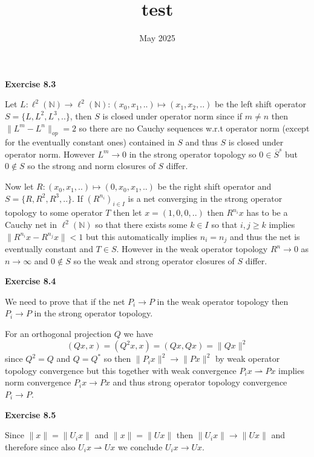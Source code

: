 \documentclass{article}
\title{test}
\date{May 2025}
\begin{document}
\vspace{0.5cm}

\textbf{Exercise 8.3}

\vspace{0.5cm}

Let $L: \ell^2(\mathbb N) \rightarrow \ell^2(\mathbb N):(x_0,x_1,..) \mapsto (x_1,x_2,..)$ be the left shift operator $S = \{L,L^2,L^3,..\}$, then $S$ is closed under operator norm since if $m \neq n$ then $\| L^m -L^n\|_{op} = 2$ so there are no Cauchy sequences w.r.t operator norm (except for the eventually constant ones) contained in $S$ and thus $S$ is closed under operator norm. However $L^m \rightarrow 0$ in the strong operator topology so $0 \in \overline S^{s}$ but $0 \not \in S$ so the strong and norm closures of $S$ differ. 

Now let $R: (x_0,x_1,..) \mapsto (0,x_0,x_1,..)$ be the right shift operator and $S = \{R,R^2,R^3,..\}$. If $(R^{n_i})_{i \in I}$ is a net converging in the strong operator topology to some operator $T$ then let $x = (1,0,0,..)$ then $R^{n_i}x$ has to be a Cauchy net in $\ell^2(\mathbb N)$ so that there exists some $k \in I$ so that $i,j \geq k$ implies $\|R^{n_i}x - R^{n_j}x \| < 1$ but this automatically implies $n_i = n_j$ and thus the net is eventually constant and $T \in S$. However in the weak operator topology $R^n \rightarrow 0$ as $n \rightarrow \infty$ and $0 \not \in S$ so the weak and strong operator closures of $S$ differ.

\vspace{0.5cm}

\textbf{Exercise 8.4}

\vspace{0.5cm}

We need to prove that if the net $P_i \rightarrow P$ in the weak operator topology then $P_i \rightarrow P$ in the strong operator topology.

For an orthogonal projection $Q$ we have 
$$(Qx,x) =(Q^2x,x) = (Qx,Qx) = \|Qx\|^2$$ 
since $Q^2 = Q$ and $Q = Q^*$ so then $\|P_ix\|^2 \rightarrow \|Px\|^2$ by weak operator topology convergence but this together with weak convergence $P_ix \rightharpoonup Px$ implies norm convergence $P_ix \rightarrow Px$ and thus strong operator topology convergence $P_i \rightarrow P$.
\vspace{0.5cm}

\textbf{Exercise 8.5}

\vspace{0.5cm}

Since $\|x\| = \|U_ix\|$ and $\|x\| = \|Ux\|$ then $\|U_ix\| \rightarrow \|Ux\|$ and therefore since also $U_ix \rightharpoonup Ux$ we conclude $U_i x \rightarrow Ux$.
\end{document}
